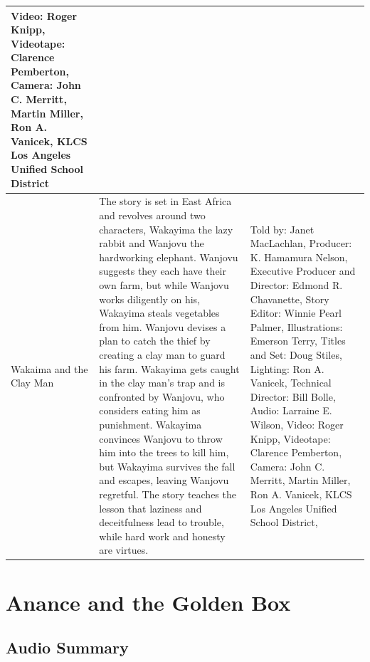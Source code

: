 \begin{table}[h]
\begin{small}
\begin{tabular}{|p{1.5cm}|p{8.5cm}|p{7cm}|}
            Video: Roger Knipp,
            Videotape: Clarence Pemberton,
            Camera: John C. Merritt, Martin Miller, Ron A. Vanicek,
            KLCS Los Angeles Unified School District
            \\
            \hline
            Wakaima and the Clay Man
                                 &
            The story is set in East Africa and revolves around two characters, Wakayima the lazy rabbit and Wanjovu the hardworking elephant.
            Wanjovu suggests they each have their own farm, but while Wanjovu works diligently on his, Wakayima steals vegetables from him.
            Wanjovu devises a plan to catch the thief by creating a clay man to guard his farm.
            Wakayima gets caught in the clay man's trap and is confronted by Wanjovu, who considers eating him as punishment.
            Wakayima convinces Wanjovu to throw him into the trees to kill him, but Wakayima survives the fall and escapes, leaving Wanjovu regretful.
            The story teaches the lesson that laziness and deceitfulness lead to trouble, while hard work and honesty are virtues.
                                 &
            Told by: Janet MacLachlan,
            Producer: K. Hamamura Nelson,
            Executive Producer and Director: Edmond R. Chavanette,
            Story Editor: Winnie Pearl Palmer,
            Illustrations: Emerson Terry,
            Titles and Set: Doug Stiles,
            Lighting: Ron A. Vanicek,
            Technical Director: Bill Bolle,
            Audio: Larraine E. Wilson,
            Video: Roger Knipp,
            Videotape: Clarence Pemberton,
            Camera: John C. Merritt, Martin Miller, Ron A. Vanicek,
            KLCS Los Angeles Unified School District,
            \\
            \hline
        \end{tabular}
    \end{small}

\end{table}

\clearpage
\newpage

\section{Anance and the Golden Box}

\subsection{Audio Summary}


